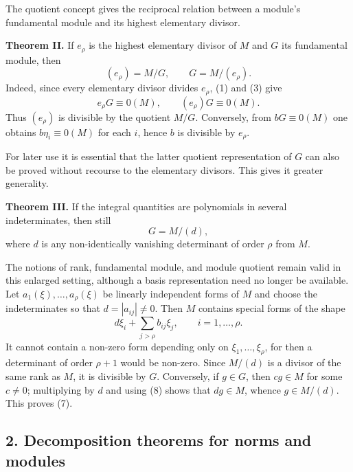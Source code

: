 \documentclass[12pt]{article}
\begin{document}
The quotient concept gives the reciprocal relation between a module's fundamental module and its highest elementary divisor.

\textbf{Theorem II.} If $e_\rho$ is the highest elementary divisor of $M$ and $G$ its fundamental module, then
\begin{equation}
  (e_\rho)=M/G,
  \qquad
  G=M/(e_\rho).                                                    \tag{5}
\end{equation}
Indeed, since every elementary divisor divides $e_\rho$, (1) and (3) give
\begin{equation}
  e_\rho G\equiv0(M),
  \qquad (e_\rho)G\equiv0(M).                                     \tag{6}
\end{equation}
Thus $(e_\rho)$ is divisible by the quotient $M/G$. Conversely, from $bG\equiv0(M)$ one obtains $b\eta_i\equiv0(M)$ for each $i$, hence $b$ is divisible by $e_\rho$.

For later use it is essential that the latter quotient representation of $G$ can also be proved without recourse to the elementary divisors. This gives it greater generality.

\textbf{Theorem III.} If the integral quantities are polynomials in several indeterminates, then still
\begin{equation}
  G=M/(d),                                                         \tag{7}
\end{equation}
where $d$ is any non-identically vanishing determinant of order $\rho$ from $M$.

The notions of rank, fundamental module, and module quotient remain valid in this enlarged setting, although a basis representation need no longer be available. Let $a_1(\xi),\ldots,a_\rho(\xi)$ be linearly independent forms of $M$ and choose the indeterminates so that $d=|a_{ij}|\ne0$. Then $M$ contains special forms of the shape
\begin{equation}
  d\xi_i+\sum_{j>\rho} b_{ij}\xi_j,
  \qquad i=1,\ldots,\rho.                                        \tag{8}
\end{equation}
It cannot contain a non-zero form depending only on $\xi_1,\ldots,\xi_\rho$, for then a determinant of order $\rho+1$ would be non-zero. Since $M/(d)$ is a divisor of the same rank as $M$, it is divisible by $G$. Conversely, if $g\in G$, then $c g\in M$ for some $c\ne0$; multiplying by $d$ and using (8) shows that $dg\in M$, whence $g\in M/(d)$. This proves (7).

\subsection{2. Decomposition theorems for norms and modules}
\end{document}
